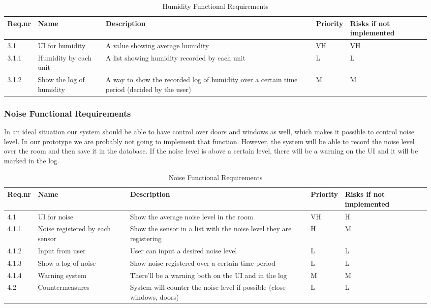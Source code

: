 \documentclass[../document]{subfiles}
\begin{document}
\begin{table}[H]
\caption{Humidity Functional Requirements}
\centering
\begin{tabularx}{\textwidth}{|l|X|X|l|X|}
	\hline
	Req.nr
	&Name
	&Description
	&Priority
	&Risks if not implemented
	\\ \hline 3.1
	&UI for humidity
	&A value showing average humidity
	&VH
	&VH
	\\ \hline 3.1.1
	&Humidity by each unit
	&A list showing humidity recorded by each unit
	&L
	&L
	\\ \hline 3.1.2
	&Show the log of humidity
	&A way to show the recorded log of humidity over a certain time period (decided by the user)
	&M
	&M
	\\ \hline 
	\end{tabularx}
	\end{table}

	\subsubsection{Noise Functional Requirements}
	In an ideal situation our system should be able to have control over doors and windows as well, which makes it possible to control noise level. In our prototype we are probably not going to implement that function. However, the system will be able to record the noise level over the room and then save it in the database. If the noise level is above a certain level, there will be a warning on the UI and it will be marked in the log.

	\begin{table}[H]
	\caption{Noise Functional Requirements}
	\centering
	\begin{tabularx}{\textwidth}{|l|X|X|l|X|}
	\hline
	Req.nr
	&Name
	&Description
	&Priority
	&Risks if not implemented
	\\ \hline 4.1
	&UI for noise
	&Show the average noise level in the room
	&VH
	&H
	\\ \hline 4.1.1
	&Noise registered by each sensor
	&Show the sensor in a list with the noise level they are registering
	&H
	&M
	\\ \hline 4.1.2
	&Input from user
	&User can input a desired noise level 
	&L
	&L
	\\ \hline 4.1.3
	&Show a log of noise
	&Show noise registered over a certain time period
	&L
	&L
	\\ \hline 4.1.4
	&Warning system
	&There’ll be a warning both on the UI and in the log
	&M
	&M
	\\ \hline 4.2
	&Countermeasures
	&System will counter the noise level if possible (close windows, doors)
	&L
	&L
	\\ \hline 
\end{tabularx}
\end{table}
\end{document}
